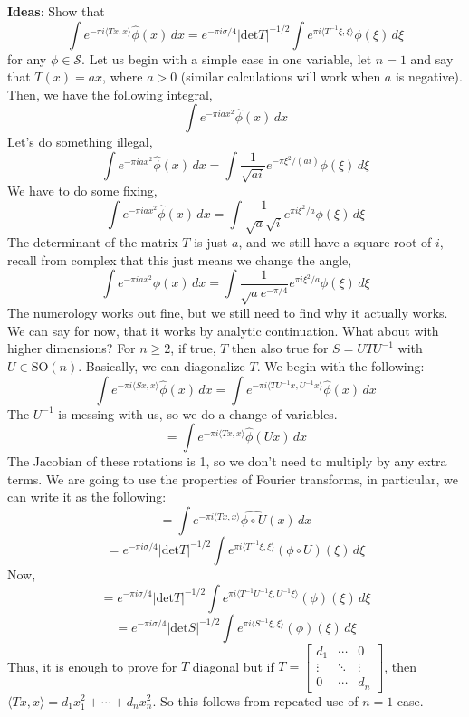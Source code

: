 \documentclass[12pt]{article}
\begin{document}
\noindent \textbf{Ideas}: Show that
$$\int e^{-\pi i \langle Tx, x \rangle} \hat{\phi}(x) \,dx = e^{-\pi i \sigma/4} \vert \text{det} T \vert^{-1/2} \int e^{\pi i \langle T^{-1} \xi, \xi \rangle} \phi(\xi) \, d\xi$$
for any $\phi \in \mathcal{S}$. Let us begin with a simple case in one variable, let $n=1$ and say that $T(x)=ax$, where $a>0$ (similar calculations will work when $a$ is negative). Then, we have the following integral,
$$\int e^{-\pi i a x^2}\hat{\phi}(x) \, dx$$
Let's do something illegal,
$$\int e^{-\pi i a x^2}\hat{\phi}(x) \, dx = \int \frac{1}{\sqrt{ai}} e^{-\pi \xi^2/(ai)} \phi(\xi) \, d\xi$$
We have to do some fixing, 
$$\int e^{-\pi i a x^2}\hat{\phi}(x) \, dx = \int \frac{1}{\sqrt{a}\sqrt{i}} e^{\pi i\xi^2/a} \phi(\xi) \, d\xi$$
\noindent The determinant of the matrix $T$ is just $a$, and we still have a square root of $i$, recall from complex that this just means we change the angle,
$$\int e^{-\pi i a x^2}\hat{\phi}(x) \, dx = \int \frac{1}{\sqrt{a}e^{-\pi/4}} e^{\pi i\xi^2/a} \phi(\xi) \, d\xi$$
\noindent The numerology works out fine, but we still need to find why it actually works. We can say for now, that it works by analytic continuation. What about with higher dimensions? For $n \geq 2$, if true, $T$ then also true for $S=UTU^{-1}$ with $U \in \text{SO}(n)$. Basically, we can diagonalize $T$. We begin with the following:
$$\int e^{-\pi i \langle Sx, x \rangle } \hat{\phi}(x) \, dx = \int e^{- \pi i \langle TU^{-1}x, U^{-1}x \rangle}\hat{\phi}(x) \,dx $$
The $U^{-1}$ is messing with us, so we do a change of variables.
$$ = \int e^{-\pi i \langle Tx, x \rangle } \hat{\phi}(Ux) \, dx$$
The Jacobian of these rotations is 1, so we don't need to multiply by any extra terms. We are going to use the properties of Fourier transforms, in particular, we can write it as the following:
$$=\int e^{-\pi i \langle Tx, x \rangle} \widehat{\phi \circ U}(x) \,dx$$
$$=e^{-\pi i \sigma/4} \vert \text{det} T \vert^{-1/2} \int e^{\pi i \langle T^{-1} \xi, \xi \rangle} (\phi \circ U)(\xi) \, d\xi$$
Now, 
$$=e^{-\pi i \sigma/4} \vert \text{det} T \vert^{-1/2} \int e^{\pi i \langle T^{-1}U^{-1} \xi, U^{-1}\xi \rangle} (\phi)(\xi) \, d\xi$$
$$=e^{-\pi i \sigma/4} \vert \text{det} S \vert^{-1/2} \int e^{\pi i \langle S^{-1} \xi, \xi \rangle} (\phi)(\xi) \, d\xi$$
Thus, it is enough to prove for $T$ diagonal but if $T = \begin{bmatrix} d_1 & \cdots & 0 \\
\vdots & \ddots & \vdots \\ 0 & \cdots & d_n \end{bmatrix}$, then $\langle Tx, x \rangle = d_1x_1^2 + \cdots + d_nx_n^2$. So this follows from repeated use of $n=1$ case. \\
\end{document}
